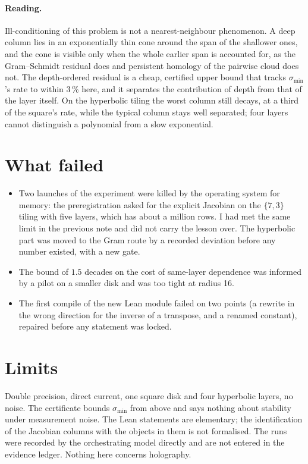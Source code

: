 \documentclass[11pt,a4paper]{article}
\begin{document}
\paragraph{Reading.} Ill-conditioning of this problem is not a nearest-neighbour phenomenon. A deep column lies in an exponentially thin cone around the span of the shallower ones, and the cone is visible only when the whole earlier span is accounted for, as the Gram--Schmidt residual does and persistent homology of the pairwise cloud does not.
The depth-ordered residual is a cheap, certified upper bound that tracks $\sigma_{\min}$'s rate to within 3\,\% here, and it separates the contribution of depth from that of the layer itself. On the hyperbolic tiling the worst column still decays, at a third of the square's rate, while the typical column stays well separated; four layers cannot distinguish a polynomial from a slow exponential.

\section{What failed}
\begin{itemize}
\item Two launches of the experiment were killed by the operating system for memory: the preregistration asked for the explicit Jacobian on the $\{7,3\}$ tiling with five layers, which has about a million rows. I had met the same limit in the previous note and did not carry the lesson over. The hyperbolic part was moved to the Gram route by a recorded deviation before any number existed, with a new gate.
\item The bound of $1.5$ decades on the cost of same-layer dependence was informed by a pilot on a smaller disk and was too tight at radius 16.
\item The first compile of the new Lean module failed on two points (a rewrite in the wrong direction for the inverse of a transpose, and a renamed constant), repaired before any statement was locked.
\end{itemize}

\section{Limits}
Double precision, direct current, one square disk and four hyperbolic layers, no noise. The certificate bounds $\sigma_{\min}$ from above and says nothing about stability under measurement noise. The Lean statements are elementary; the identification of the Jacobian columns with the objects in them is not formalised.
The runs were recorded by the orchestrating model directly and are not entered in the evidence ledger. Nothing here concerns holography.
\end{document}
